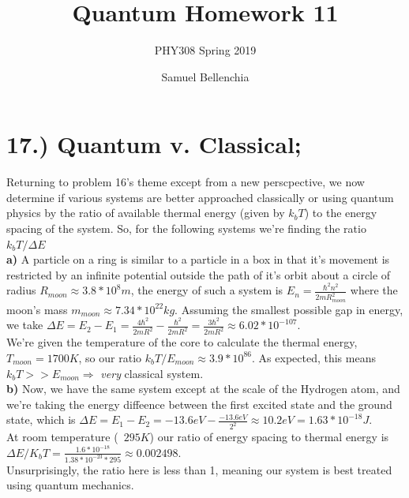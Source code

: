 \documentclass{journal}
\title{Quantum Homework 11}
\subtitle{PHY308 Spring 2019}
\author{Samuel Bellenchia}
\begin{document}
\maketitle
\section*{17.) Quantum v. Classical; }
%
Returning to problem 16's theme except from a new perscpective, we now determine if various systems are better approached classically or using quantum physics by the ratio of available thermal energy (given by $k_bT$) to the energy spacing of the system. So, for the following systems we're finding the ratio $k_bT/\Delta E$ \\

\textbf{a)} A particle on a ring is similar to a particle in a box in that it's movement is restricted by an infinite potential outside the path of it's orbit about a circle of radius $R_{moon}\approx3.8*10^8m$, the energy of such a system is $E_n=\frac{\hbar^2n^2}{2mR_{moon}^2}$ where the moon's mass $m_{moon}\approx7.34*10^{22}kg$. Assuming the smallest possible gap in energy, we take $\Delta E=E_2-E_1=\frac{4\hbar^2}{2mR^2}-\frac{\hbar^2}{2mR^2}=\frac{3\hbar^2}{2mR^2}\approx6.02*10^{-107}$.\\
We're given the temperature of the core to calculate the thermal energy, $T_{moon}=1700K$, so our ratio  $k_bT/E_{moon}\approx3.9*10^{86}$. As expected, this means $k_bT>>E_{moon}\Rightarrow$ \textit{very} classical system.\\

\textbf{b) } Now, we have the same system except at the scale of the Hydrogen atom, and we're taking the energy diffeence between the first excited state and the ground state, which is $\Delta E=E_1-E_2=-13.6eV-\frac{-13.6eV}{2^2}\approx10.2eV=1.63*10^{-18}J$.\\ At room temperature (~$295K$) our ratio of energy spacing to thermal energy is $\Delta E/K_bT=\frac{1.6*10^{-18}}{1.38*10^{-23}*295}\approx0.002498$.\\

Unsurprisingly, the ratio here is less than 1, meaning our system is best treated using quantum mechanics.\\
\end{document}
